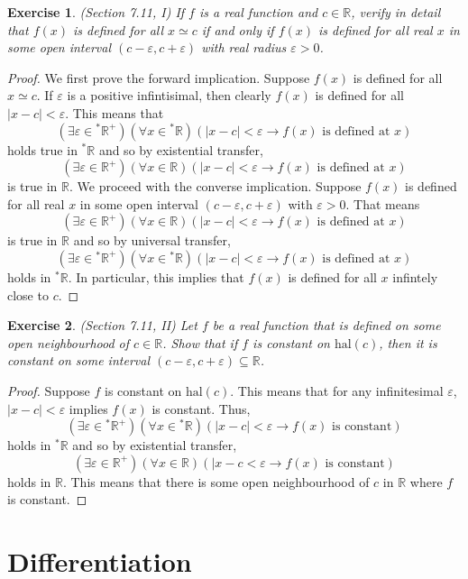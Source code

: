 \documentclass[a4paper, 11pt, openany]{book}
\theoremstyle{plain}
\newtheorem{exercise}{Exercise}[chapter]
\theoremstyle{plain}
\newcommand{\arr}{\rightarrow}
\newcommand{\R}{\mathbb{R}}
\newcommand{\ep}{\varepsilon}
\newcommand{\hyp}{{}^*}
\newcommand{\hal}{\text{hal}}
\begin{document}
  \begin{exercise}
    (Section 7.11, I)
      If $f$ is a real function and $c \in \R$, verify in detail that $f(x)$ is defined for all $x \simeq c$ if and only if $f(x)$ is defined for all real $x$ in some open interval $(c-\ep, c+\ep)$ with real radius $\ep>0$.
  \end{exercise}
  \begin{proof}
    We first prove the forward implication. Suppose $f(x)$ is defined for all $x \simeq c$. If $\ep$ is a positive infintisimal, then clearly $f(x)$ is defined for all $|x-c|<\ep$. This means that $$(\exists \ep \in \hyp \R^+)(\forall x \in \hyp \R)(|x-c|<\ep \arr f(x) \text{ is defined at } x)$$ holds true in $\hyp \R$ and so by existential transfer, $$(\exists \ep \in \R^+)(\forall x \in \R)(|x-c|<\ep\arr f(x) \text{ is defined at } x)$$ is true in $\R$. We proceed with the converse implication. Suppose $f(x)$ is defined for all real $x$ in some open interval $(c-\ep, c+\ep)$ with $\ep>0$. That means $$(\exists \ep \in \R^+)(\forall x \in \R)(|x-c|<\ep \arr f(x) \text{ is defined at } x) $$ is true in $\R$ and so by universal transfer, $$(\exists \ep \in \hyp \R^+)(\forall x \in \hyp \R)(|x-c|<\ep \arr f(x) \text{ is defined at } x) $$ holds in $\hyp \R$. In particular, this implies that $f(x)$ is defined for all $x$ infintely close to $c$.
  \end{proof}

  \begin{exercise}
    (Section 7.11, II)
    Let $f$ be a real function that is defined on some open neighbourhood of $c \in \R$. Show that if $f$ is constant on $\hal(c)$, then it is constant on some interval $(c-\ep, c+\ep) \subseteq \R$.
  \end{exercise}
  \begin{proof}
    Suppose $f$ is constant on $\hal(c)$. This means that for any infinitesimal $\ep$, $|x-c|<\ep$ implies $f(x)$ is constant. Thus, $$(\exists \ep \in \hyp \R^+)(\forall x \in \hyp \R)(|x-c|<\ep \arr f(x) \text{ is constant})$$ holds in $\hyp \R$ and so by existential transfer, $$(\exists \ep \in \R^+)(\forall x \in \R)(|x-c<\ep \arr f(x) \text{ is constant})$$ holds in $\R$. This means that there is some open neighbourhood of $c$ in $\R$ where $f$ is constant.
  \end{proof}

\chapter{Differentiation}
\end{document}
